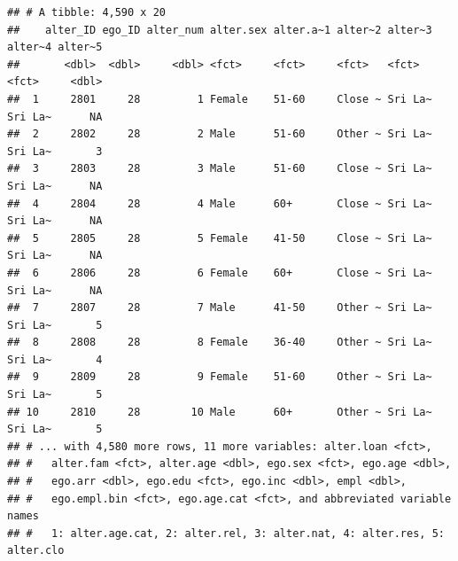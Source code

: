 \documentclass[
]{book}
\newenvironment{Shaded}{\begin{snugshade}}{\end{snugshade}}
\newcommand{\AttributeTok}[1]{\textcolor[rgb]{0.77,0.63,0.00}{#1}}
\newcommand{\CommentTok}[1]{\textcolor[rgb]{0.56,0.35,0.01}{\textit{#1}}}
\newcommand{\DocumentationTok}[1]{\textcolor[rgb]{0.56,0.35,0.01}{\textbf{\textit{#1}}}}
\newcommand{\FunctionTok}[1]{\textcolor[rgb]{0.00,0.00,0.00}{#1}}
\newcommand{\NormalTok}[1]{#1}
\newcommand{\SpecialCharTok}[1]{\textcolor[rgb]{0.00,0.00,0.00}{#1}}
\begin{document}
\begin{verbatim}
## # A tibble: 4,590 x 20
##    alter_ID ego_ID alter_num alter.sex alter.a~1 alter~2 alter~3 alter~4 alter~5
##       <dbl>  <dbl>     <dbl> <fct>     <fct>     <fct>   <fct>   <fct>     <dbl>
##  1     2801     28         1 Female    51-60     Close ~ Sri La~ Sri La~      NA
##  2     2802     28         2 Male      51-60     Other ~ Sri La~ Sri La~       3
##  3     2803     28         3 Male      51-60     Close ~ Sri La~ Sri La~      NA
##  4     2804     28         4 Male      60+       Close ~ Sri La~ Sri La~      NA
##  5     2805     28         5 Female    41-50     Close ~ Sri La~ Sri La~      NA
##  6     2806     28         6 Female    60+       Close ~ Sri La~ Sri La~      NA
##  7     2807     28         7 Male      41-50     Other ~ Sri La~ Sri La~       5
##  8     2808     28         8 Female    36-40     Other ~ Sri La~ Sri La~       4
##  9     2809     28         9 Female    51-60     Other ~ Sri La~ Sri La~       5
## 10     2810     28        10 Male      60+       Other ~ Sri La~ Sri La~       5
## # ... with 4,580 more rows, 11 more variables: alter.loan <fct>,
## #   alter.fam <fct>, alter.age <dbl>, ego.sex <fct>, ego.age <dbl>,
## #   ego.arr <dbl>, ego.edu <fct>, ego.inc <dbl>, empl <dbl>,
## #   ego.empl.bin <fct>, ego.age.cat <fct>, and abbreviated variable names
## #   1: alter.age.cat, 2: alter.rel, 3: alter.nat, 4: alter.res, 5: alter.clo
\end{verbatim}

\begin{Shaded}
\end{Shaded}
\end{document}
